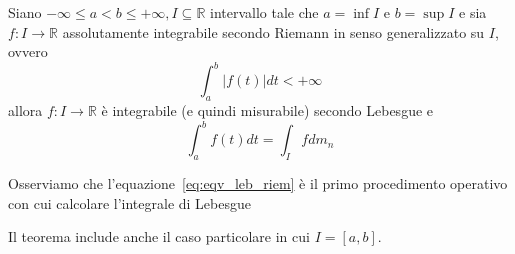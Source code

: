 %
\vspace{0.5cm}
\begin{theorem}[\textcolor{blue}{integrale di Riemann $1-$dimensionale con l'integrale di Lebesgue}]
	Siano $-\infty \leq a < b \leq +\infty, I \subseteq \mathbb{R}$ intervallo tale che $a = \inf{I}$ e $b=\sup{I}$ e sia $f: I \to \mathbb{R}$ assolutamente integrabile secondo Riemann in senso generalizzato su $I$, ovvero
	$$
	\int_a^b |f(t)|dt < +\infty
	$$
	allora $f: I \to \mathbb{R}$ è integrabile (e quindi misurabile) secondo Lebesgue e
	\begin{equation}
		\int_a^b f(t)dt = \int_I fdm_n
		\label{eq:eqv_leb_riem}
	\end{equation}
\end{theorem}
%
\begin{remark}
	Osserviamo che l'equazione~\ref{eq:eqv_leb_riem} è il primo procedimento operativo con cui calcolare l'integrale di Lebesgue
\end{remark}
%
\begin{remark}
	Il teorema include anche il caso particolare in cui $I=[a,b]$.
\end{remark}
%
